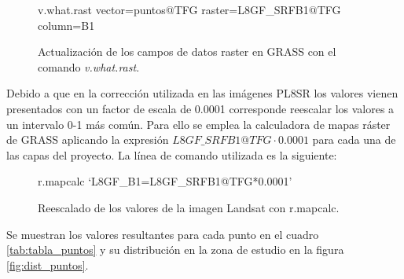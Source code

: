 \begin{figure}[ht]
\centering
\begin{boxedverbatim}
	v.what.rast vector=puntos@TFG raster=L8GF_SRFB1@TFG column=B1
\end{boxedverbatim}
\caption[Actualización de los datos raster]{Actualización de los campos de datos raster en GRASS con el comando \textit{v.what.rast}.}
\label{fig:v.what.rast}
\end{figure}

Debido a que en la corrección utilizada en las imágenes \ac{PL8SR} los valores vienen presentados con un factor de escala de 0.0001 \citep{USGS2015} corresponde reescalar los valores a un intervalo 0-1 más común. Para ello se emplea la calculadora de mapas ráster de GRASS aplicando la expresión $L8GF\_SRFB1@TFG \cdot 0.0001$ para cada una de las capas del proyecto. La línea de comando utilizada es la siguiente:

\begin{figure}[ht]
	\centering
	\begin{boxedverbatim}
	r.mapcalc `L8GF_B1=L8GF_SRFB1@TFG*0.0001'
	\end{boxedverbatim}
	\caption[Reescalado de valores]{Reescalado de los valores de la imagen Landsat con r.mapcalc.}
\end{figure}

Se muestran los valores resultantes para cada punto en el cuadro \ref{tab:tabla_puntos} y su distribución en la zona de estudio en la figura \ref{fig:dist_puntos}.\Sep

